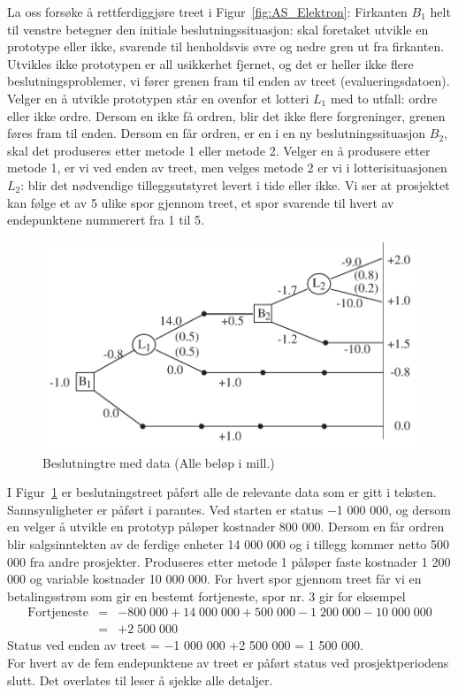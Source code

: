{{La oss forsøke å rettferdiggjøre treet i Figur~\ref{fig:AS_Elektron}: 
Firkanten $B_1$ helt til venstre betegner den initiale beslutningssituasjon:
skal foretaket utvikle en prototype eller ikke, svarende til henholdsvis
øvre og nedre gren ut fra firkanten.  Utvikles ikke prototypen er all
usikkerhet fjernet, og det er heller ikke flere beslutningsproblemer, vi
fører grenen fram til enden av treet (eva\-luerings\-datoen).  Velger en å
utvikle prototypen står en ovenfor et lotteri $L_1$ med to utfall:
ordre eller ikke ordre.  Dersom en ikke få ordren, blir det ikke flere
forgreninger, grenen føres fram til enden.  Dersom en får ordren,
er en i en ny beslutningssituasjon $B_2$, skal det produseres etter 
metode 1 eller metode 2. Velger en å produsere etter metode 1, er vi ved
enden av treet, men velges metode 2 er vi i lotterisituasjonen $L_2$:
blir det nødvendige tilleggs\-utstyret levert i tide eller ikke.  Vi ser
at prosjektet kan følge et av 5 ulike spor gjennom treet, et spor 
svarende til hvert av endepunktene nummerert fra 1 til 5.

\begin{figure}[ht]
\centering
 \includegraphics[scale=0.8]{figurer/fig16_2.pdf} 
\caption{Beslutningtre med data (Alle beløp i mill.)}
	\label{fig:alle_data}
\end{figure}

I Figur~\ref{fig:alle_data} er beslutningstreet påført alle de relevante data som er 
gitt i teksten.  Sannsynligheter er påført i parantes.  Ved starten
er status $-$1 000 000, og dersom en velger å utvikle en prototyp 
påløper kostnader 800 000.  Dersom en får ordren blir 
salgsinntekten av de ferdige enheter 14 000 000 og i tillegg kommer 
netto 500 000 fra andre prosjekter.  Produseres etter metode 1 påløper
faste kostnader 1 200 000 og variable kostnader 10 000 000.  For hvert spor
gjennom treet får vi en betalingsstrøm som gir en bestemt
fortjeneste, spor nr. 3 gir for eksempel
\begin{eqnarray*}
\mbox{Fortjeneste}&=&-800\;000+14\;000\;000+500\;000-1\;200\;000-10\;000\;000\\
                     &=&+2\;500\;000
\end{eqnarray*}
Status ved enden av treet = $-$1 000 000 +2 500 000 = 1 500 000.\\
For hvert av de fem endepunktene av treet er påført status ved 
prosjekt\-perio\-dens slutt. Det overlates til leser å sjekke alle detaljer.

}}
